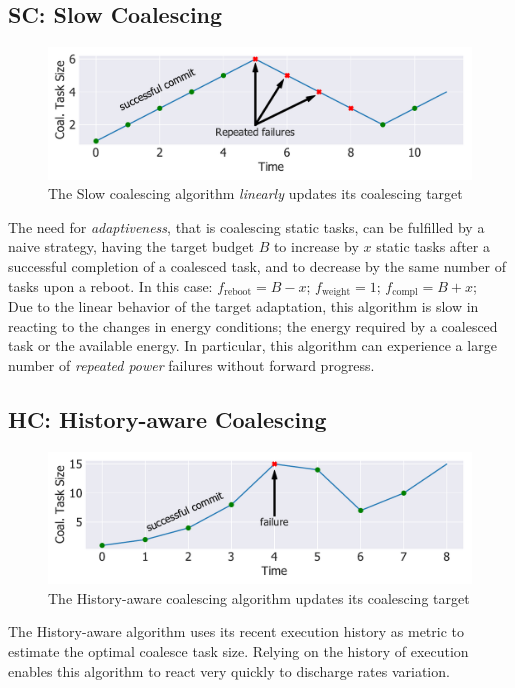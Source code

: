 \subsection{SC: Slow Coalescing}
\label{subsec:slowCoalescing}

\begin{figure}
	\centering
	\includegraphics[width=\columnwidth]{figures/slowCoal}%
	\caption{The Slow coalescing algorithm \emph{linearly} updates its coalescing target}
	\label{fig:slowCoal}
\end{figure}

The need for \emph{adaptiveness}, that is coalescing static tasks, can be fulfilled by a naive strategy, having the target budget $B$ to increase by $x$ static tasks after a successful completion of a coalesced task, and to decrease by the same number of tasks upon a reboot. In this case: $f_\text{reboot} = B - x$; $f_\text{weight} =  1$; $f_\text{compl} = B + x$; \\
Due to the linear behavior of the target adaptation, this algorithm is slow in reacting to the changes in energy conditions; the energy required by a coalesced task or the available energy. In particular, this algorithm can experience a large number of \emph{repeated power} failures without forward progress.

\subsection{HC: History-aware Coalescing}
\label{subsec:hCCoalescing}

\begin{figure}
	\centering
	\includegraphics[width=\columnwidth]{figures/HCCoal}%
	\caption{The History-aware coalescing algorithm  updates its coalescing target}
	\label{fig:HCCoal}
\end{figure}

The History-aware algorithm uses its recent execution history as metric to estimate the optimal coalesce task size. Relying on the history of execution enables this algorithm to react very quickly to discharge rates variation. 














